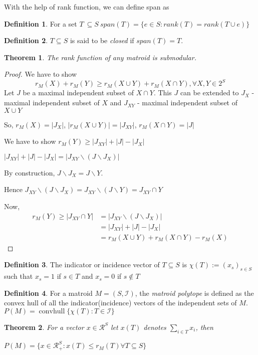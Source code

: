 \documentclass[options]{article}
\newtheorem{theorem}{Theorem}
\theoremstyle{definition}
\newtheorem{definition}{Definition}
\newcommand{\independentI}{\mathcal{I}}
\DeclareMathOperator*{\convhull}{convhull}
\begin{document}
With the help of rank function, we can define span as
\begin{definition}
For a set $T\ \subseteq S \ span(T) = \{ e \in S: rank(T) = rank(T \cup {e}) \} $
\end{definition}

\begin{definition}
$T \subseteq S$ is said to be \emph{closed} if $span(T) = T$.
\end{definition}
\begin{theorem}
The rank function of any matroid is submodular.
\end{theorem}

\begin{proof}
    We have to show
    \[
    r_M (X)+r_M (Y) \geq r_M (X \cup Y) + r_M (X \cap Y), \forall X,Y \in 2^S
    \]
    Let $J$ be a maximal independent subset of $ X \cap Y$. This $J$ can be extended to $J_X$ - maximal independent subset of $X$ and $J_{XY}$ -  maximal independent subset of $X \cup Y$ 
    
  So, $r_M(X) = |J_X|$, $|r_M(X \cup Y)| = |J_{XY}|$, $r_M(X \cap Y)= |J|$

We have to show $r_M(Y) \geq |J_{XY}|+|J|-|J_X|$

$|J_{XY}|+|J|-|J_X| = |J_{XY}\backslash (J \backslash J_X)| $

By construction,
$ J \backslash J_X = J \backslash Y$.

Hence $J_{XY}\backslash (J \backslash J_X) = J_{XY}\backslash (J \backslash Y) = J_{XY} \cap Y$

Now, 
\begin{align*}
r_M (Y) \geq |J_{XY} \cap Y| &= |J_{XY}\backslash (J \backslash J_X)| \\
 &=  |J_{XY}|+|J|-|J_X|\\
  &= r_M (X \cup Y) + r_M (X \cap Y)- r_M(X)  
\end{align*}
\end{proof}
\begin{definition}
The indicator or incidence vector of $ T \subseteq S$ is $\chi (T) := (x_s)_{s \in S}$ such that $x_s =1$  if $s \in T$ and $x_s =0$  if $s \notin T$   
\end{definition}

\begin{definition}
For a matroid $M = (S,\independentI)$, the \emph{matroid polytope} is defined as the convex hull of all the indicator(incidence) vectors of the independent sets of $M$. $P(M) = \convhull \{ \chi (T): T \in  \independentI \} $
\end{definition}
\begin{theorem}
For a vector $x \in \mathcal{R}^S$ let $x(T)$ denotes $\sum_{i \in T} x_i$, then 

$P(M) = \{ x \in \mathcal{R}_{+}^{S} : x(T) \leq r_M(T) \forall T \subseteq S \}$
\end{theorem}
\end{document}
